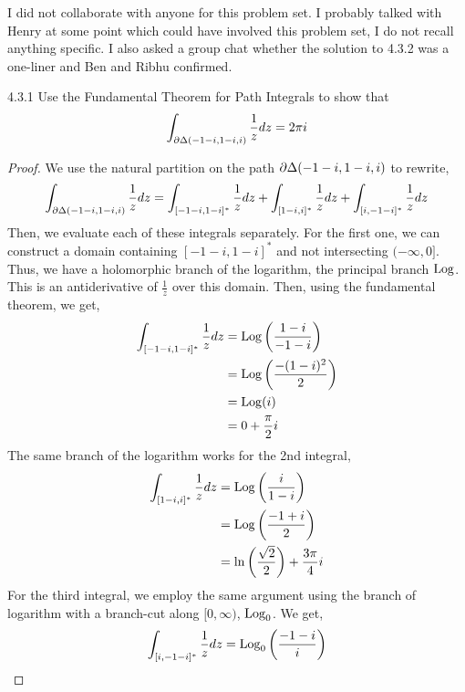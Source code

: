 \documentclass[12pt]{amsart}
\begin{document}


\begin{remark}
    I did not collaborate with anyone for this problem set. I probably talked with Henry at some point which could have involved this problem set, I do not recall anything specific. 
    I also asked a group chat whether the solution to 4.3.2 was a one-liner and Ben and Ribhu confirmed. 
\end{remark}

\begin{problem}{4.3.1}
    Use the Fundamental Theorem for Path Integrals to show that 
    \[ \int_{\partial\Delta(-1-i, 1-i, i)} \frac{1}{z} dz = 2\pi i\]
\end{problem}
\begin{proof}   
    We use the natural partition on the path $\partial\Delta(-1-i, 1-i, i)$ to rewrite, 
    \begin{align*}
        \int_{\partial\Delta(-1-i, 1-i, i)} \frac{1}{z} dz = \int_{[-1-i, 1-i]^*} \frac{1}{z} dz + \int_{[1-i, i]^*} \frac{1}{z} dz + \int_{[i, -1-i]^*} \frac{1}{z} dz 
    \end{align*}
    Then, we evaluate each of these integrals separately. For the first one, we can construct a domain containing $[-1-i, 1-i]^*$ and not intersecting $(-\infty, 0]$. Thus, we have a holomorphic branch of the logarithm, the principal branch $\operatorname{Log}$. This is an antiderivative of $\frac{1}{z}$ over this domain. Then, using the fundamental theorem, we get, 
    \begin{align*}
        \int_{[-1-i, 1-i]^*} \frac{1}{z} dz &= \operatorname{Log}\left(\frac{1-i}{-1-i}\right) \\
        &= \operatorname{Log}\left(\frac{-(1-i)^2}{2}\right) \\
        &= \operatorname{Log}(i) \\
        &= 0 + \frac{\pi}{2}i
    \end{align*}
    The same branch of the logarithm works for the 2nd integral, 
    \begin{align*}
       \int_{[1-i, i]^*} \frac{1}{z} dz &= \operatorname{Log}\left(\frac{i}{1-i}\right) \\
       &= \operatorname{Log}\left(\frac{-1+i}{2}\right) \\
       &= \ln\left(\frac{\sqrt{2}}{2}\right) + \frac{3\pi}{4}i
    \end{align*}
    For the third integral, we employ the same argument using the branch of logarithm with a branch-cut along $[0, \infty)$, $\operatorname{Log}_0$. We get,
    \begin{align*}
       \int_{[i, -1-i]^*} \frac{1}{z} dz &= \Log_0\left(\frac{-1-i}{i}\right) \\

\end{align*}
\end{proof}
\end{document}

